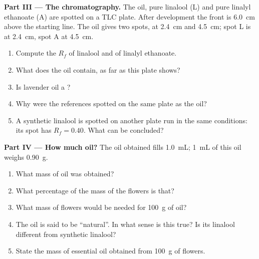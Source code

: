 \begin{problem}
\medskip
\noindent\textbf{Part III --- The chromatography.}
The oil, pure linalool (L) and pure linalyl ethanoate (A) are spotted on
a TLC plate. After development the front is \qty{6.0}{cm} above the
starting line. The oil gives two spots, at \qty{2.4}{cm} and
\qty{4.5}{cm}; spot L is at \qty{2.4}{cm}, spot A at \qty{4.5}{cm}.
\begin{enumerate}[resume]
  \item Compute the $R_f$ of linalool and of linalyl ethanoate.
  \item What does the oil contain, as far as this plate shows?
  \item Is lavender oil a ?
  \item Why were the references spotted on the same plate as the oil?
  \item A synthetic linalool is spotted on another plate run in the same
        conditions: its spot has $R_f = 0.40$. What can be concluded?
\end{enumerate}

\medskip
\noindent\textbf{Part IV --- How much oil?}
The oil obtained fills \qty{1.0}{mL}; \qty{1}{mL} of this oil weighs
\qty{0.90}{g}.
\begin{enumerate}[resume]
  \item What mass of oil was obtained?
  \item What percentage of the mass of the flowers is that?
  \item What mass of flowers would be needed for \qty{100}{g} of oil?
  \item The oil is said to be ``natural''. In what sense is this true? Is
        its linalool different from synthetic linalool?
  \item State the mass of essential oil obtained from \qty{100}{g} of
        flowers.
\end{enumerate}
\end{problem}
